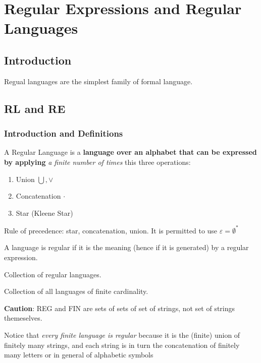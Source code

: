 \chapter{Regular Expressions and Regular Languages}
    \section{Introduction}
        Regual languages are the simplest family of formal language.
    \section{RL and RE}
        \subsection{Introduction and Definitions}
            A Regular Language is a \textbf{language over an alphabet that can be expressed by applying} \emph{a finite number of times} this three operations:
            \begin{enumerate}
                \item Union $\bigcup, \vee$
                \item Concatenation $\cdot$
                \item Star (Kleene Star)
            \end{enumerate}
            Rule of precedence: star, concatenation, union.
            It is permitted to use $\varepsilon = \emptyset^* $
            
            \begin{RegularLanguage}
                A language is regular  if it is the meaning (hence if it is generated) by a regular expression.
            \end{RegularLanguage}
            \begin{famreg}
                Collection of regular languages.
            \end{famreg}
            \begin{famfin}
                Collection of all languages of finite cardinality.
            \end{famfin}
            \textbf{Caution}: REG and FIN are sets of sets of set of strings, not set of strings themeselves.

            Notice that \emph{every finite language is regular} because it is the (finite)
            union of finitely many strings, and each string is in turn the concatenation
            of finitely many letters or in general of alphabetic symbols

